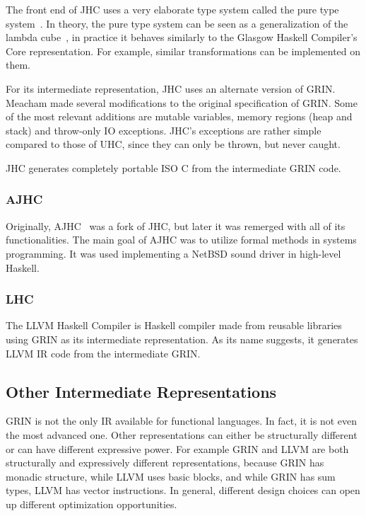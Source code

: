 \documentclass[main.tex]{subfiles}
\begin{document}
	The front end of JHC uses a very elaborate type system called the pure type system~\cite{pts-berardi, pts-terlouw}. In theory, the pure type system can be seen as a generalization of the lambda cube~\cite{lambda-cube}, in practice it behaves similarly to the Glasgow Haskell Compiler's Core representation. For example, similar transformations can be implemented on them.
	
	For its intermediate representation, JHC uses an alternate version of GRIN. Meacham made several modifications to the original specification of GRIN. Some of the most relevant additions are mutable variables, memory regions (heap and stack) and throw-only IO exceptions. JHC's exceptions are rather simple compared to those of UHC, since they can only be thrown, but never caught.
	
	JHC generates completely portable ISO C from the intermediate GRIN code.
	
	\subsubsection{AJHC}
	
	Originally, AJHC~\cite{ajhc} was a fork of JHC, but later it was remerged with all of its functionalities. The main goal of AJHC was to utilize formal methods in systems programming. It was used implementing a NetBSD sound driver in high-level Haskell.
	
	\subsubsection{LHC}
	
	The LLVM Haskell Compiler is Haskell compiler made from reusable libraries using GRIN as its intermediate representation. As its name suggests, it generates LLVM IR code from the intermediate GRIN.
	
	\subsection{Other Intermediate Representations}
	
	GRIN is not the only IR available for functional languages. In fact, it is not even the most advanced one. Other representations can either be structurally different or can have different expressive power. For example GRIN and LLVM are both structurally and expressively different representations, because GRIN has monadic structure, while LLVM uses basic blocks, and while GRIN has sum types, LLVM has vector instructions. In general, different design choices can open up different optimization opportunities.
	
\end{document}
